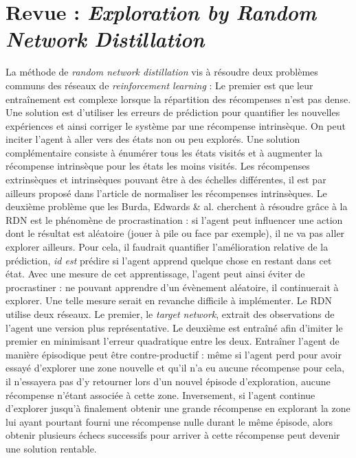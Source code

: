 \documentclass[a4paper,12pt]{report}
\begin{document}
\newpage \section{Revue : \textit{Exploration by Random Network Distillation} \cite{distillation}}
\label{revue_distillation}
\indent La méthode de \textit{random network distillation} vis à résoudre deux problèmes communs des réseaux de \textit{reinforcement learning} :
\newline Le premier est que leur entraînement est complexe lorsque la répartition des récompenses n'est pas dense.
\newline Une solution est d’utiliser les erreurs de prédiction pour quantifier les nouvelles expériences et ainsi corriger le système par une récompense intrinsèque. On peut inciter l’agent à aller vers des états non ou peu explorés. Une solution complémentaire consiste à énumérer tous les états visités et à augmenter la récompense intrinsèque pour les états les moins visités. Les récompenses extrinsèques et intrinsèques pouvant être à des échelles différentes, il est par ailleurs proposé dans l'article de normaliser les récompenses intrinsèques.
\newline \indent  Le deuxième problème que les Burda, Edwards \& al. cherchent à résoudre grâce à la RDN est le phénomène de procrastination : si l’agent peut influencer une action dont le résultat est aléatoire (jouer à pile ou face par exemple), il ne va pas aller explorer ailleurs.
\newline Pour cela, il faudrait quantifier l’amélioration relative de la prédiction, \textit{id est} prédire si l’agent apprend quelque chose en restant dans cet état. Avec une mesure de cet apprentissage, l'agent peut ainsi éviter de procrastiner : ne pouvant apprendre d'un évènement aléatoire, il continuerait à explorer. Une telle mesure serait en revanche difficile à implémenter.
\newline
\newline \indent  Le RDN utilise deux réseaux. Le premier, le \textit{target network}, extrait des observations de l’agent une version plus représentative. Le deuxième est entraîné afin d’imiter le premier en minimisant l’erreur quadratique entre les deux.
\newline
\newline \indent  Entraîner l’agent de manière épisodique peut être contre-productif : même si l’agent perd pour avoir essayé d’explorer une zone nouvelle et qu’il n’a eu aucune récompense pour cela, il n'essayera pas d'y retourner lors d'un nouvel épisode d'exploration, aucune récompense n'étant associée à cette zone. Inversement, si l'agent continue d'explorer jusqu'à finalement obtenir une grande récompense en explorant la zone lui ayant pourtant fourni une récompense nulle durant le même épisode, alors obtenir plusieurs échecs successifs pour arriver à cette récompense peut devenir une solution rentable.
\end{document}
